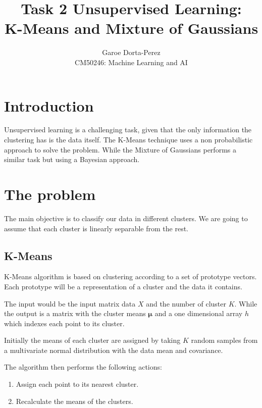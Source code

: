 \documentclass[12pt]{article}
\begin{document}
  
\title{Task 2 Unsupervised Learning: \\K-Means and Mixture of Gaussians}
\author{Garoe Dorta-Perez\\
CM50246: Machine Learning and AI}
 
\maketitle
 
\section{Introduction}
 
Unsupervised learning is a challenging task, given that the only information the clustering has is the data itself.
The K-Means technique uses a non probabilistic approach to solve the problem.
While the Mixture of Gaussians performs a similar task but using a Bayesian approach.

\section{The problem}

The main objective is to classify our data in different clusters.
We are going to assume that each cluster is linearly separable from the rest.

\subsection{K-Means}

K-Means algorithm is based on clustering according to a set of prototype vectors.
Each prototype will be a representation of a cluster and the data it contains.

The input would be the input matrix data $X$ and the number of cluster $K$.
While the output is a matrix with the cluster means $\boldsymbol{\mu}$ and a one dimensional array $h$ which indexes each point to its cluster.
 
Initially the means of each cluster are assigned by taking $K$ random samples from a multivariate normal distribution with the data mean and covariance.

The algorithm then performs the following actions:

\begin{enumerate}
\item Assign each point to its nearest cluster.
\item Recalculate the means of the clusters.
\end{enumerate}
\end{document}
